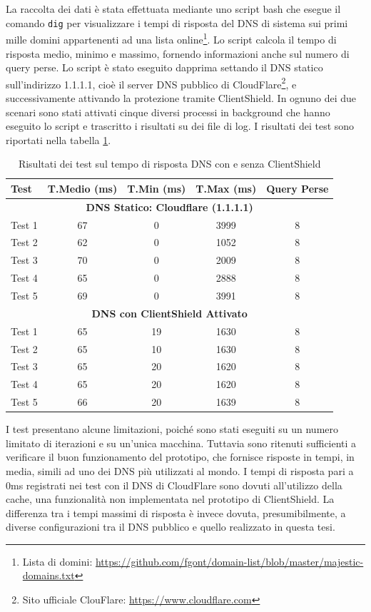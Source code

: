 \documentclass[12pt,a4paper,openright,twoside]{book}
\begin{document}
La raccolta dei dati è stata effettuata mediante uno script bash che esegue il comando \texttt{dig} per visualizzare i tempi di risposta del \gls{DNS} di sistema sui primi mille domini appartenenti ad una lista online\footnote{Lista di domini: \url{https://github.com/fgont/domain-list/blob/master/majestic-domains.txt}}.
Lo script calcola il tempo di risposta medio, minimo e massimo, fornendo informazioni anche sul numero di query perse.
Lo script è stato eseguito dapprima settando il \gls{DNS} statico sull'indirizzo 1.1.1.1, cioè il server \gls{DNS} pubblico di CloudFlare\footnote{Sito ufficiale ClouFlare: \url{https://www.cloudflare.com}}, e successivamente attivando la protezione tramite ClientShield.
In ognuno dei due scenari sono stati attivati cinque diversi processi in background che hanno eseguito lo script e trascritto i risultati su dei file di log.
I risultati dei test sono riportati nella tabella \ref{tab:dns-tests}.

\begin{table}[h]
	\centering
	\renewcommand{\arraystretch}{1.3} %
	\setlength{\tabcolsep}{10pt} %
	\begin{tabular}{lcccc}
		\toprule
		\textbf{Test} & \textbf{T.Medio (ms)} & \textbf{T.Min (ms)} & \textbf{T.Max (ms)} & \textbf{Query Perse} \\
		\midrule
		\multicolumn{5}{c}{\textbf{DNS Statico: Cloudflare (1.1.1.1)}} \\
		\midrule
		Test 1 & 67 & 0 & 3999 & 8 \\
		Test 2 & 62 & 0 & 1052 & 8 \\
		Test 3 & 70 & 0 & 2009 & 8 \\
		Test 4 & 65 & 0 & 2888 & 8 \\
		Test 5 & 69 & 0 & 3991 & 8 \\
		\midrule
		\multicolumn{5}{c}{\textbf{DNS con ClientShield Attivato}} \\
		\midrule
		Test 1 & 65 & 19 & 1630 & 8 \\
		Test 2 & 65 & 10 & 1630 & 8 \\
		Test 3 & 65 & 20 & 1620 & 8 \\
		Test 4 & 65 & 20 & 1620 & 8 \\
		Test 5 & 66 & 20 & 1639 & 8 \\
		\bottomrule
	\end{tabular}
	\caption{Risultati dei test sul tempo di risposta DNS con e senza ClientShield}
	\label{tab:dns-tests}
\end{table}
I test presentano alcune limitazioni, poiché sono stati eseguiti su un numero limitato di iterazioni e su un'unica macchina.
Tuttavia sono ritenuti sufficienti a verificare il buon funzionamento del prototipo, che fornisce risposte in tempi, in media, simili ad uno dei \gls{DNS} più utilizzati al mondo.
I tempi di risposta pari a 0ms registrati nei test con il \gls{DNS} di CloudFlare sono dovuti all'utilizzo della cache, una funzionalità non implementata nel prototipo di ClientShield.  
La differenza tra i tempi massimi di risposta è invece dovuta, presumibilmente, a diverse configurazioni tra il \gls{DNS} pubblico e quello realizzato in questa tesi.
\end{document}

